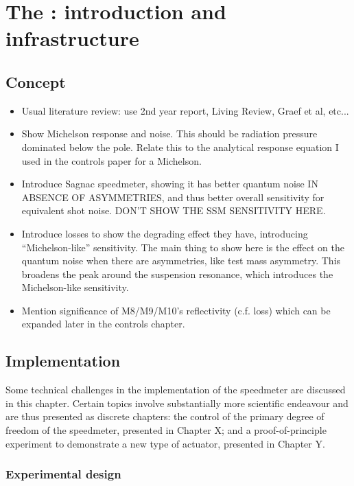 \chapter{The \SSMEXPT{}: introduction and infrastructure}
\label{c:speedmeter-intro}

\section{Concept}
\begin{itemize}
  \item Usual literature review: use 2nd year report, Living Review, Graef et al, etc...
  \item Show Michelson response and noise. This should be radiation pressure dominated below the pole. Relate this to the analytical response equation I used in the controls paper for a Michelson.
  \item Introduce Sagnac speedmeter, showing it has better quantum noise IN ABSENCE OF ASYMMETRIES, and thus better overall sensitivity for equivalent shot noise. DON'T SHOW THE SSM SENSITIVITY HERE.
  \item Introduce losses to show the degrading effect they have, introducing ``Michelson-like'' sensitivity. The main thing to show here is the effect on the quantum noise when there are asymmetries, like test mass asymmetry. This broadens the peak around the suspension resonance, which introduces the Michelson-like sensitivity.
  \item Mention significance of M8/M9/M10's reflectivity (c.f. loss) which can be expanded later in the controls chapter.
\end{itemize}

\section{Implementation}

Some technical challenges in the implementation of the speedmeter are discussed in this chapter. Certain topics involve substantially more scientific endeavour and are thus presented as discrete chapters: the control of the primary degree of freedom of the speedmeter, presented in Chapter X; and a proof-of-principle experiment to demonstrate a new type of actuator, presented in Chapter Y.

\subsection{Experimental design}

